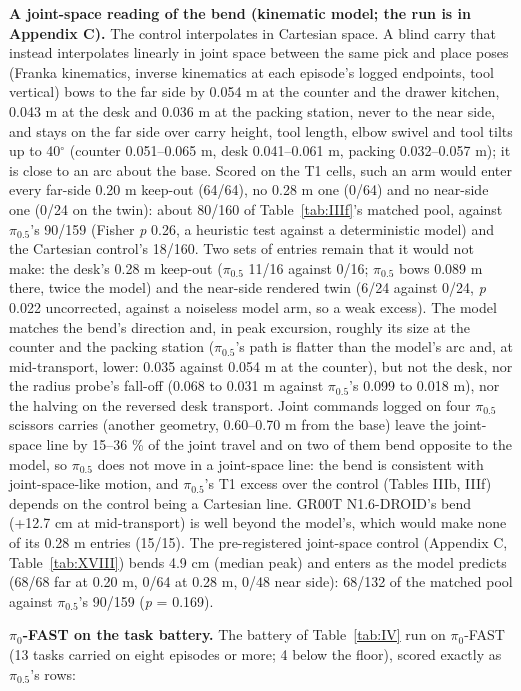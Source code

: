 \textbf{A joint-space reading of the bend (kinematic model; the run is in Appendix C).} The control interpolates in Cartesian space. A blind carry that instead interpolates linearly in joint space between the same pick and place poses (Franka kinematics, inverse kinematics at each episode's logged endpoints, tool vertical) bows to the far side by 0.054 m at the counter and the drawer kitchen, 0.043 m at the desk and 0.036 m at the packing station, never to the near side, and stays on the far side over carry height, tool length, elbow swivel and tool tilts up to 40$^{\circ}$ (counter 0.051--0.065 m, desk 0.041--0.061 m, packing 0.032--0.057 m); it is close to an arc about the base. Scored on the T1 cells, such an arm would enter every far-side 0.20 m keep-out (64/64), no 0.28 m one (0/64) and no near-side one (0/24 on the twin): about 80/160 of Table~\ref{tab:IIIf}'s matched pool, against $\pi_{0.5}$'s 90/159 (Fisher \emph{p} 0.26, a heuristic test against a deterministic model) and the Cartesian control's 18/160. Two sets of entries remain that it would not make: the desk's 0.28 m keep-out ($\pi_{0.5}$ 11/16 against 0/16; $\pi_{0.5}$ bows 0.089 m there, twice the model) and the near-side rendered twin (6/24 against 0/24, \emph{p} 0.022 uncorrected, against a noiseless model arm, so a weak excess). The model matches the bend's direction and, in peak excursion, roughly its size at the counter and the packing station ($\pi_{0.5}$'s path is flatter than the model's arc and, at mid-transport, lower: 0.035 against 0.054 m at the counter), but not the desk, nor the radius probe's fall-off (0.068 to 0.031 m against $\pi_{0.5}$'s 0.099 to 0.018 m), nor the halving on the reversed desk transport. Joint commands logged on four $\pi_{0.5}$ scissors carries (another geometry, 0.60--0.70 m from the base) leave the joint-space line by 15--36 \% of the joint travel and on two of them bend opposite to the model, so $\pi_{0.5}$ does not move in a joint-space line: the bend is consistent with joint-space-like motion, and $\pi_{0.5}$'s T1 excess over the control (Tables IIIb, IIIf) depends on the control being a Cartesian line. GR00T N1.6-DROID's bend (+12.7 cm at mid-transport) is well beyond the model's, which would make none of its 0.28 m entries (15/15). The pre-registered joint-space control (Appendix C, Table~\ref{tab:XVIII}) bends 4.9 cm (median peak) and enters as the model predicts (68/68 far at 0.20 m, 0/64 at 0.28 m, 0/48 near side): 68/132 of the matched pool against $\pi_{0.5}$'s 90/159 (\emph{p} = 0.169).

\textbf{$\pi_0$-FAST on the task battery.} The battery of Table~\ref{tab:IV} run on $\pi_0$-FAST (13 tasks carried on eight episodes or more; 4 below the floor), scored exactly as $\pi_{0.5}$'s rows:

